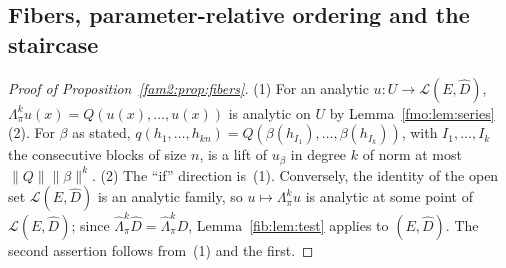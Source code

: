 \documentclass[11pt]{amsart}
\theoremstyle{definition}
\theoremstyle{remark}
\numberwithin{equation}{section}
\newcommand{\cL}{\mathcal L}
\newcommand{\norm}[1]{\lVert #1\rVert}
\theoremstyle{plain}
\theoremstyle{definition}
\theoremstyle{plain}
\newcommand{\hLambda}{\widehat\Lambda}
\begin{document}
\subsection{Fibers, parameter-relative ordering and the staircase}\label{fmo:ssec:mixed}

\begin{proof}[Proof of Proposition~\ref{fam2:prop:fibers}]
(1) For an analytic $u\colon U\to\cL(E,\widehat D)$, $\Lambda^k_\pi u(x)=Q(u(x),\dots,u(x))$ is analytic on $U$ by
Lemma~\ref{fmo:lem:series}(2). For $\beta$ as stated, $q(h_1,\dots,h_{kn})=Q(\beta(h_{I_1}),\dots,\beta(h_{I_k}))$, with
$I_1,\dots,I_k$ the consecutive blocks of size $n$, is a lift of $u_\beta$ in degree $k$ of norm at most
$\norm Q\norm\beta^k$. (2) The ``if'' direction is~(1). Conversely, the identity of the open set $\cL(E,\widehat D)$ is an
analytic family, so $u\mapsto\Lambda^k_\pi u$ is analytic at some point of $\cL(E,\widehat D)$; since
$\hLambda^k_\pi\widehat D=\hLambda^k_\pi D$, Lemma~\ref{fib:lem:test} applies to $(E,\widehat D)$. The second assertion
follows from~(1) and the first.
\end{proof}
\end{document}
